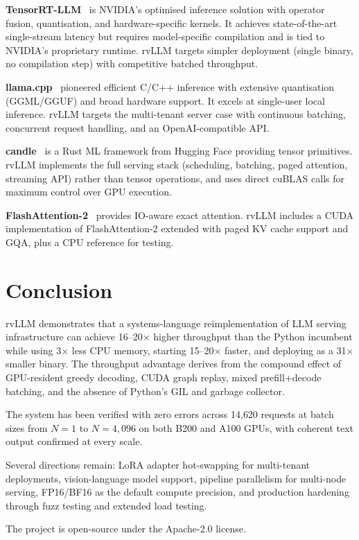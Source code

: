 \documentclass[11pt,a4paper]{article}
\begin{document}
\textbf{TensorRT-LLM}~\cite{tensorrtllm2024} is NVIDIA's optimised inference
solution with operator fusion, quantisation, and hardware-specific kernels. It
achieves state-of-the-art single-stream latency but requires model-specific
compilation and is tied to NVIDIA's proprietary runtime. rvLLM targets simpler
deployment (single binary, no compilation step) with competitive batched throughput.

\textbf{llama.cpp}~\cite{llamacpp2023} pioneered efficient C/C++ inference with
extensive quantisation (GGML/GGUF) and broad hardware support. It excels at
single-user local inference. rvLLM targets the multi-tenant server case with
continuous batching, concurrent request handling, and an OpenAI-compatible API.

\textbf{candle}~\cite{candle2023} is a Rust ML framework from Hugging Face
providing tensor primitives. rvLLM implements the full serving stack
(scheduling, batching, paged attention, streaming API) rather than tensor operations,
and uses direct cuBLAS calls for maximum control over GPU execution.

\textbf{FlashAttention-2}~\cite{dao2023flashattention2} provides IO-aware exact
attention. rvLLM includes a CUDA implementation of FlashAttention-2 extended with
paged KV cache support and GQA, plus a CPU reference for testing.

\section{Conclusion}
\label{sec:conclusion}

rvLLM demonstrates that a systems-language reimplementation of LLM serving
infrastructure can achieve 16--20$\times$ higher throughput than the Python
incumbent while using 3$\times$ less CPU memory, starting 15--20$\times$ faster,
and deploying as a 31$\times$ smaller binary. The throughput advantage derives
from the compound effect of GPU-resident greedy decoding, CUDA graph replay,
mixed prefill+decode batching, and the absence of Python's GIL and garbage collector.

The system has been verified with zero errors across 14{,}620 requests at batch
sizes from $N\!=\!1$ to $N\!=\!4{,}096$ on both B200 and A100 GPUs, with coherent
text output confirmed at every scale.

Several directions remain: LoRA adapter hot-swapping for multi-tenant deployments,
vision-language model support, pipeline parallelism for multi-node serving, FP16/BF16
as the default compute precision, and production hardening through fuzz testing and
extended load testing.

The project is open-source under the Apache-2.0 license.



\end{document}
